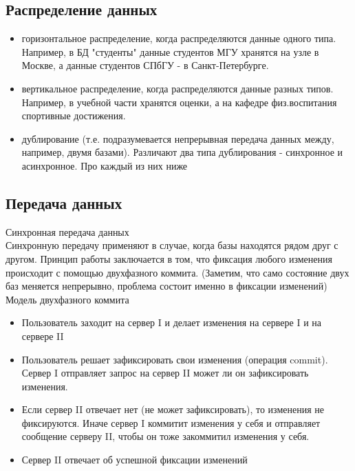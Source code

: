 \subsection {Распределение данных}

\begin{itemize}
\item горизонтальное распределение, когда распределяются данные одного типа. Например, в БД "студенты" данные студентов МГУ хранятся на узле в Москве, а данные студентов СПбГУ - в Санкт-Петербурге. 

\item вертикальное распределение, когда распределяются данные разных типов. Например, в учебной части хранятся оценки, а на кафедре физ.воспитания спортивные достижения. 

\item дублирование (т.е. подразумевается непрерывная передача данных между, например, двумя базами). Различают два типа дублирования - синхронное и асинхронное. Про каждый из них ниже
\end{itemize}

\subsection {Передача данных}
Синхронная передача данных \\
Синхронную передачу применяют в случае, когда базы находятся рядом друг с другом. Принцип работы заключается в том, что фиксация любого изменения происходит с помощью двухфазного коммита. (Заметим, что само состояние двух баз меняется непрерывно, проблема состоит именно в фиксации изменений) \\ 
Модель двухфазного коммита
\begin {itemize}
\item Пользователь заходит на сервер I и делает изменения на сервере I и на сервере II
\item Пользователь решает зафиксировать свои изменения (операция commit). Сервер I отправляет запрос на сервер II может ли он зафиксировать изменения.
\item Если сервер II отвечает нет (не может зафиксировать), то изменения не фиксируются. Иначе сервер I коммитит изменения у себя и отправляет сообщение серверу II, чтобы он тоже закоммитил изменения у себя. 
\item Сервер II отвечает об успешной фиксации изменений
\end {itemize}


